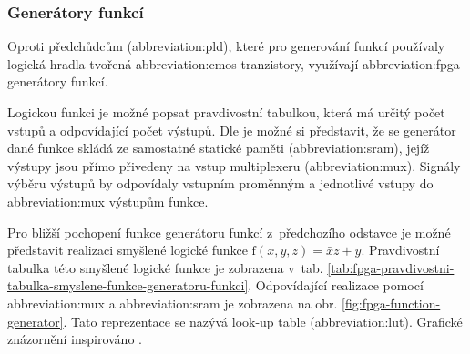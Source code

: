 \documentclass[a4paper, twoside, 11pt]{article}
\begin{document}
		\subsubsection{Generátory funkcí}\label{subsubsec:generatory-funkci}
		Oproti předchůdcům (\gls{abbreviation:pld}), které pro generování funkcí používaly logická hradla tvořená \gls{abbreviation:cmos} tranzistory, využívají \gls{abbreviation:fpga} generátory funkcí.\par
		Logickou funkci je možné popsat pravdivostní tabulkou, která má určitý počet vstupů a odpovídající počet výstupů. Dle \cite{Sass2010} je možné si představit, že se generátor dané funkce skládá ze samostatné statické paměti (\gls{abbreviation:sram}), jejíž výstupy jsou přímo přivedeny na vstup multiplexeru (\gls{abbreviation:mux}). Signály výběru výstupů by odpovídaly vstupním proměnným a jednotlivé vstupy do \gls{abbreviation:mux} výstupům funkce.\par
		Pro bližší pochopení funkce generátoru funkcí z~předchozího odstavce je možné představit realizaci smyšlené logické funkce $\text{f} (x, y, z) = \bar{x}z + y$. Pravdivostní tabulka této smyšlené logické funkce je zobrazena v~tab. \ref{tab:fpga-pravdivostni-tabulka-smyslene-funkce-generatoru-funkci}. Odpovídající realizace pomocí \gls{abbreviation:mux} a \gls{abbreviation:sram} je zobrazena na obr. \ref{fig:fpga-function-generator}. Tato reprezentace se nazývá look-up table (\gls{abbreviation:lut}). Grafické znázornění inspirováno \cite{Sass2010}.
		
\end{document}
